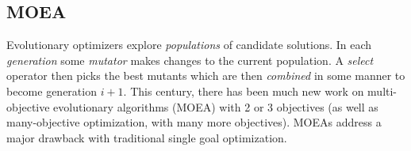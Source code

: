 \documentclass[10pt,journal,compsoc]{IEEEtran}
\newcommand{\bi}{\begin{itemize}}
\newcommand{\ei}{\end{itemize}}
\begin{document}

\subsection{MOEA}\label{sec:w}
Evolutionary optimizers explore {\em populations} of candidate solutions.
In each {\em generation} some {\em mutator} makes changes to the current population. 
A {\em select} operator then picks the best mutants which are then {\em combined} in some manner to become generation $i+1$.
This century, there has been much new work on multi-objective evolutionary algorithms (MOEA) with 2 or 3 objectives (as well as many-objective optimization, with many more objectives).   
MOEAs address a major drawback with traditional single goal optimization.
\end{document}
